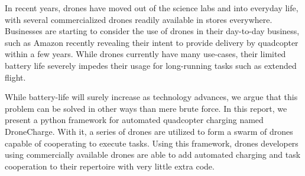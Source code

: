 In recent years, drones have moved out of the science labs and into everyday life, with several commercialized drones readily available in stores everywhere. Businesses are starting to consider the use of drones in their day-to-day business, such as Amazon recently revealing their intent to provide delivery by quadcopter within a few years. While drones currently have many use-cases, their limited battery life severely impedes their usage for long-running tasks such as extended flight.

While battery-life will surely increase as technology advances, we argue that this problem can be solved in other ways than mere brute force. In this report, we present a python framework for automated quadcopter charging named DroneCharge. With it, a series of drones are utilized to form a swarm of drones capable of cooperating to execute tasks. Using this framework, drones developers using commercially available drones are able to add automated charging and task cooperation to their repertoire with very little extra code.